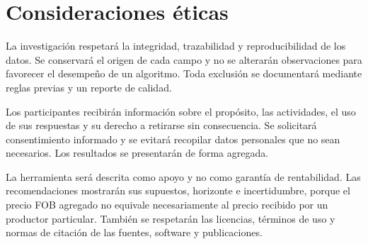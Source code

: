 \section{Consideraciones éticas}

La investigación respetará la integridad, trazabilidad y reproducibilidad de los datos. Se conservará el origen de cada campo y no se alterarán observaciones para favorecer el desempeño de un algoritmo. Toda exclusión se documentará mediante reglas previas y un reporte de calidad.

Los participantes recibirán información sobre el propósito, las actividades, el uso de sus respuestas y su derecho a retirarse sin consecuencia. Se solicitará consentimiento informado y se evitará recopilar datos personales que no sean necesarios. Los resultados se presentarán de forma agregada.

La herramienta será descrita como apoyo y no como garantía de rentabilidad. Las recomendaciones mostrarán sus supuestos, horizonte e incertidumbre, porque el precio FOB agregado no equivale necesariamente al precio recibido por un productor particular. También se respetarán las licencias, términos de uso y normas de citación de las fuentes, software y publicaciones.
